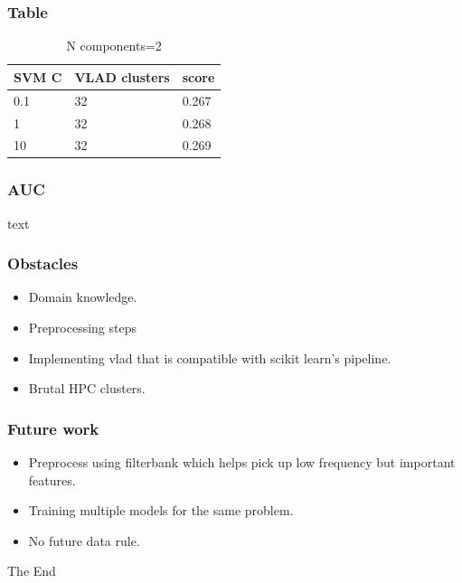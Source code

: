 \documentclass{beamer}
\begin{document}
\begin{frame}
\frametitle{Table}
\begin{table}
\begin{tabular}{l l l}
\toprule
\textbf{ SVM C} & \textbf{VLAD clusters} & \textbf{score} \\
\midrule
0.1 & 32 & 0.267\\
1 & 32 & 0.268\\
10 & 32 & 0.269\\
\bottomrule
\end{tabular}
\caption{N components=2}
\end{table}
\end{frame}


\begin{frame}
\frametitle{AUC}
text
\end{frame}


\begin{frame}
\frametitle{Obstacles}
\begin{itemize}
\item Domain knowledge.
\item Preprocessing steps
\item Implementing vlad that is compatible with scikit learn's pipeline.
\item Brutal HPC clusters.
\end{itemize}
\end{frame} 


\begin{frame}
\frametitle{Future work}
\begin{itemize}
\item Preprocess using filterbank which helps pick up low frequency but important features.
\item Training multiple models for the same problem.
\item No future data rule.
\end{itemize}
\end{frame} 



\begin{frame}
\Huge{\centerline{The End}}
\end{frame}
\end{document}
